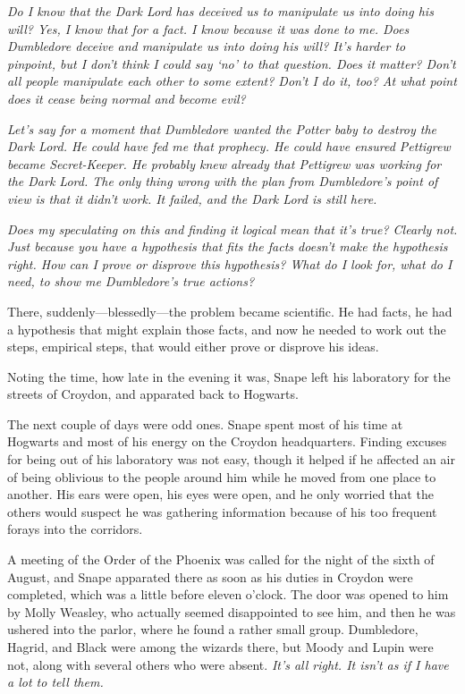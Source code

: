 \emph{Do I know that the Dark Lord has deceived us to manipulate us into doing his will? Yes, I know that for a fact. I know because it was done to me. Does Dumbledore deceive and manipulate us into doing his will? It's harder to pinpoint, but I don't think I could say `no' to that question. Does it matter? Don't all people manipulate each other to some extent? Don't I do it, too? At what point does it cease being normal and become evil?}

\emph{Let's say for a moment that Dumbledore wanted the Potter baby to destroy the Dark Lord. He could have fed me that prophecy. He could have ensured Pettigrew became Secret-Keeper. He probably knew already that Pettigrew was working for the Dark Lord. The only thing wrong with the plan from Dumbledore's point of view is that it didn't work. It failed, and the Dark Lord is still here.}

\emph{Does my speculating on this and finding it logical mean that it's true? Clearly not. Just because you have a hypothesis that fits the facts doesn't make the hypothesis right. How can I prove or disprove this hypothesis? What do I look for, what do I need, to show me Dumbledore's true actions?}

There, suddenly—blessedly—the problem became scientific. He had facts, he had a hypothesis that might explain those facts, and now he needed to work out the steps, empirical steps, that would either prove or disprove his ideas.

Noting the time, how late in the evening it was, Snape left his laboratory for the streets of Croydon, and apparated back to Hogwarts.

The next couple of days were odd ones. Snape spent most of his time at Hogwarts and most of his energy on the Croydon headquarters. Finding excuses for being out of his laboratory was not easy, though it helped if he affected an air of being oblivious to the people around him while he moved from one place to another. His ears were open, his eyes were open, and he only worried that the others would suspect he was gathering information because of his too frequent forays into the corridors.

A meeting of the Order of the Phoenix was called for the night of the sixth of August, and Snape apparated there as soon as his duties in Croydon were completed, which was a little before eleven o'clock. The door was opened to him by Molly Weasley, who actually seemed disappointed to see him, and then he was ushered into the parlor, where he found a rather small group. Dumbledore, Hagrid, and Black were among the wizards there, but Moody and Lupin were not, along with several others who were absent. \emph{It's all right. It isn't as if I have a lot to tell them.}

